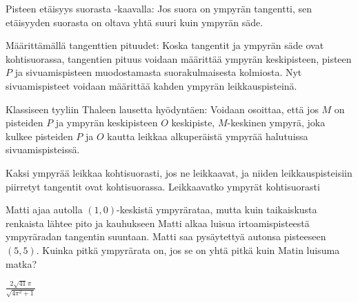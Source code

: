 \begin{tehtavasivu}
\begin{tehtava}
Pisteen etäisyys suorasta -kaavalla: Jos suora on ympyrän tangentti, sen etäisyyden suorasta on oltava yhtä suuri kuin ympyrän säde.

Määrittämällä tangenttien pituudet: Koska tangentit ja ympyrän säde ovat kohtisuorassa, tangentien pituus voidaan määrittää ympyrän keskipisteen, pisteen $P$ ja sivuamispisteen muodostamasta suorakulmaisesta kolmiosta. Nyt sivuamispisteet voidaan määrittää kahden ympyrän leikkauspisteinä.

Klassiseen tyyliin Thaleen lausetta hyödyntäen: Voidaan osoittaa, että jos $M$ on pisteiden $P$ ja ympyrän keskipisteen $O$ keskipiste, $M$-keskinen ympyrä, joka kulkee pisteiden $P$ ja $O$ kautta leikkaa alkuperäistä ympyrää halutuissa sivuamispisteissä.

\begin{alakohdat}
\end{alakohdat}
\begin{vastaus}
\begin{alakohdat}
\end{alakohdat}
\end{vastaus}
\end{tehtava}

\begin{tehtava}
Kaksi ympyrää leikkaa kohtisuorasti, jos ne leikkaavat, ja niiden leikkauspisteisiin piirretyt tangentit ovat kohtisuorassa. Leikkaavatko ympyrät kohtisuorasti
\begin{alakohdat}
\end{alakohdat}  
\begin{vastaus}
\begin{alakohdat}
\end{alakohdat}
\end{vastaus}
\end{tehtava}

\begin{tehtava}
Matti ajaa autolla $(1,0)$-keskistä ympyrärataa, mutta kuin taikaiskusta renkaista lähtee pito ja kauhukseen Matti alkaa luisua irtoamispisteestä ympyräradan tangentin suuntaan. Matti saa pysäytettyä autonsa pisteeseen $(5,5)$. Kuinka pitkä ympyrärata on, jos se on yhtä pitkä kuin Matin luisuma matka?
\begin{vastaus}
$\frac{2\sqrt{41}\pi}{\sqrt{4\pi^2+1}}$
\end{vastaus}
\end{tehtava}


\end{tehtavasivu}

